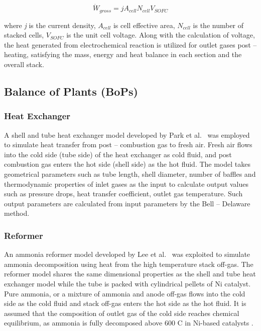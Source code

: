 \documentclass[a4paper,10pt]{cas-dc} %
\begin{document}
\begin{equation}
{\dot{W}}_{gross} = jA_{cell}N_{cell}V_{SOFC} \label{eq:gross-power}
\end{equation}

where \emph{j} is the current density, \({A}_{cell}\) is cell effective area, \({N}_{cell}\) is the number of stacked cells, \({V}_{SOFC}\) is the unit cell voltage.
Along with the calculation of voltage, the heat generated from electrochemical reaction is utilized for outlet gases post -- heating, satisfying the mass, energy and heat balance in each section and the overall stack.

\subsection{Balance of Plants (BoPs)}

\subsubsection{Heat Exchanger}

A shell and tube heat exchanger model developed by Park et al.~\cite{PARK2019351} was employed to simulate heat transfer from post -- combustion gas to fresh air.
Fresh air flows into the cold side (tube side) of the heat exchanger as cold fluid, and post combustion gas enters the hot side (shell side) as the hot fluid.
The model takes geometrical parameters such as tube length, shell diameter, number of baffles and thermodynamic properties of inlet gases as the input to calculate output values such as pressure drops, heat transfer coefficient, outlet gas temperature.
Such output parameters are calculated from input parameters by the Bell -- Delaware method.

\subsubsection{Reformer}

An ammonia reformer model developed by Lee et al.~\cite{LEE2025238271} was exploited to simulate ammonia decomposition using heat from the high temperature stack off-gas.
The reformer model shares the same dimensional properties as the shell and tube heat exchanger model while the tube is packed with cylindrical pellets of Ni catalyst.
Pure ammonia, or a mixture of ammonia and anode off-gas flows into the cold side as the cold fluid and stack off-gas enters the hot side as the hot fluid.
It is assumed that the composition of outlet gas of the cold side reaches chemical equilibrium, as ammonia is fully decomposed above 600 \textdegree C in Ni-based catalysts \cite{FUERTE2009170,LUCENTINI201912693, MAFFEI2008221}.
\end{document}
